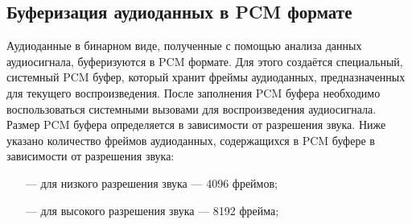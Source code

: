     \subsection{Буферизация аудиоданных в PCM формате}
        \par Аудиоданные в бинарном виде, полученные с помощью анализа данных аудиосигнала, буферизуются в PCM формате.
        Для этого создаётся специальный, системный PCM буфер, который хранит фреймы аудиоданных, 
        предназначенных для текущего воспроизведения. 
        После заполнения PCM буфера необходимо воспользоваться системными вызовами для воспроизведения аудиосигнала.
        Размер PCM буфера определяется в зависимости от разрешения звука.
        Ниже указано количество фреймов аудиоданных, содержащихся в PCM буфере в зависимости от разрешения звука:
        \begin{itemize}
            \item[---] для низкого разрешения звука --- 4096 фреймов;
            \item[---] для высокого разрешения звука --- 8192 фрейма;
        \end{itemize}

